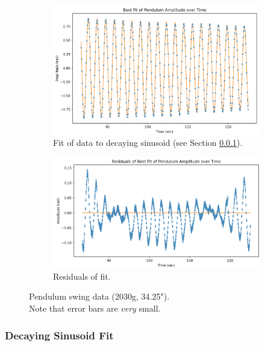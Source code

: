 \documentclass[12pt]{article}
\begin{document}
\begin{figure}[h]
    \centering
    \begin{subfigure}[b]{0.48\textwidth}
        \centering
        \includegraphics[width=\textwidth]{q2_fit.png}
        \caption{Fit of data to decaying sinusoid (see Section \ref{section:q2fit}).}
        \label{fig:q2fit}
    \end{subfigure}
    \hfill
    \begin{subfigure}[b]{0.48\textwidth}
        \centering
        \includegraphics[width=\textwidth]{q2_residuals.png}
        \caption{Residuals of fit.}
        \label{fig:q2residuals}
    \end{subfigure}
    \hfill
    \caption{Pendulum swing data (2030g, 34.25"). \\Note that error bars are \emph{very} small.}
    \label{fig:q2fig}
\end{figure}
\subsubsection{Decaying Sinusoid Fit}
\label{section:q2fit}
\end{document}
